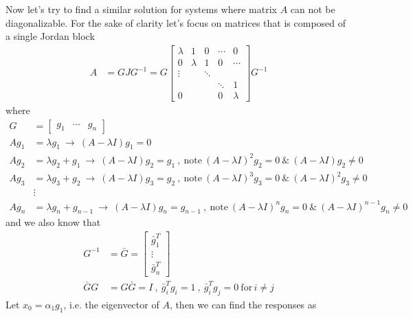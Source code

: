 \documentclass[twoside]{article}
\begin{document}
Now let's try to find a similar solution for systems where matrix $A$ can not be diagonalizable. For the sake of clarity let's focus on 
matrices that is composed of a single Jordan block
%
\begin{align*}
A &= G J G^{-1} = G \left[  \begin{array}{ccccc} \lambda & 1 & 0 & \cdots & 0  \\ 0 & \lambda & 1 & 0 & \cdots  \\ 
\vdots &  & \ddots &  \\ & & & \ddots & 1 \\
0 &  &  & 0 & \lambda \end{array} \right] G^{-1} 
\end{align*}
%
\noindent where
%
\begin{align*}
	 G &= \left[ \begin{array}{ccc} g_1 & \cdots & g_n \end{array} \right]
	 \\
 A g_1 &= \lambda g_1 \ \rightarrow \ (A - \lambda I) g_1 = 0
	\\
	A g_2 &= \lambda g_2 + g_1 \ \rightarrow \ (A - \lambda I) g_2 = g_1 \ , \ \mathrm{note} \ (A - \lambda I)^2 g_2 = 0 \ \& \ (A - \lambda I) g_2 \neq 0
		\\
	A g_3 &= \lambda g_3 + g_2 \ \rightarrow \ (A - \lambda I) g_3 = g_2 \ , \ \mathrm{note} \ (A - \lambda I)^3 g_3 = 0 \ \& \ (A - \lambda I)^2 g_3 \neq 0
	\\
	&\vdots
	\\
	A g_{n} &= \lambda g_{n} + g_{n-1} \ \rightarrow \ (A - \lambda I) g_n = g_{n-1} \ , \ \mathrm{note} \ (A - \lambda I)^n g_n = 0 \ \& \ (A - \lambda I)^{n-1} g_{n} \neq 0
\end{align*}
and we also know that
\begin{align*}
 G^{-1} &= \bar{G} =  \left[ \begin{array}{c} \bar{g}_1^T \\ \vdots \\ \bar{g}_n^T \end{array} \right] 
  \\
\bar{G} G &= G \bar{G} = I \ , \ \bar{g}_i^T g_i = 1 \ , \  \bar{g}_i^T g_j = 0 \ \mathrm{for} \, i \neq j
\end{align*}
%
Let $x_0 = \alpha_1 g_1$, i.e. the eigenvector of $A$, then we can find the responses as
\end{document}
